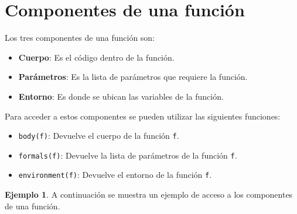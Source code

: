 \documentclass[
]{book}
\newenvironment{Shaded}{\begin{snugshade}}{\end{snugshade}}
\newcommand{\CommentTok}[1]{\textcolor[rgb]{0.56,0.35,0.01}{\textit{#1}}}
\newcommand{\ControlFlowTok}[1]{\textcolor[rgb]{0.13,0.29,0.53}{\textbf{#1}}}
\newcommand{\DecValTok}[1]{\textcolor[rgb]{0.00,0.00,0.81}{#1}}
\newcommand{\FunctionTok}[1]{\textcolor[rgb]{0.00,0.00,0.00}{#1}}
\newcommand{\NormalTok}[1]{#1}
\newcommand{\OtherTok}[1]{\textcolor[rgb]{0.56,0.35,0.01}{#1}}
\newcommand{\SpecialCharTok}[1]{\textcolor[rgb]{0.00,0.00,0.00}{#1}}
\providecommand{\tightlist}{%
  \setlength{\itemsep}{0pt}\setlength{\parskip}{0pt}}
\theoremstyle{definition}
\theoremstyle{definition}
\newtheorem{example}{Ejemplo}[chapter]
\theoremstyle{definition}
\theoremstyle{definition}
\theoremstyle{remark}
\begin{document}
\hypertarget{componentes-de-una-funciuxf3n}{%
\section{Componentes de una función}\label{componentes-de-una-funciuxf3n}}

Los tres componentes de una función son:

\begin{itemize}
\tightlist
\item
  \textbf{Cuerpo}: Es el código dentro de la función.
\item
  \textbf{Parámetros}: Es la lista de parámetros que requiere la función.
\item
  \textbf{Entorno}: Es donde se ubican las variables de la función.
\end{itemize}

Para acceder a estos componentes se pueden utilizar las siguientes funciones:

\begin{itemize}
\tightlist
\item
  \texttt{body(f)}: Devuelve el cuerpo de la función \texttt{f}.
\item
  \texttt{formals(f)}: Devuelve la lista de parámetros de la función \texttt{f}.
\item
  \texttt{environment(f)}: Devuelve el entorno de la función \texttt{f}.
\end{itemize}

\begin{example}

A continuación se muestra un ejemplo de acceso a los componentes de una función.

\begin{Shaded}
\end{Shaded}

\end{example}
\end{document}
